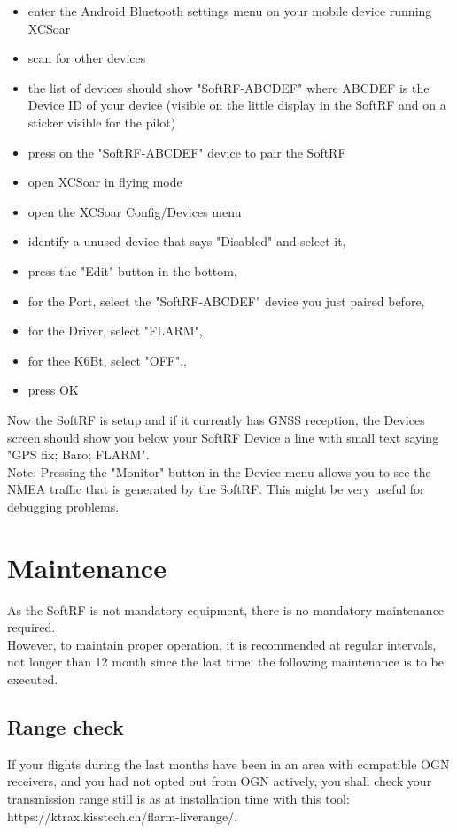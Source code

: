 \documentclass[10pt,a4paper]{article}
\begin{document}
\begin{itemize}
\item enter the Android Bluetooth settings menu on your mobile device running XCSoar
\item scan for other devices
\item the list of devices should show "SoftRF-ABCDEF" where ABCDEF is the Device ID of your device (visible on the little display in the SoftRF and on a sticker visible for the pilot)
\item press on the "SoftRF-ABCDEF" device to pair the SoftRF
\item open XCSoar in flying mode
\item open the XCSoar Config/Devices menu
\item identify a unused device that says "Disabled" and select it, 
\item press the "Edit" button in the bottom,
\item for the Port, select the "SoftRF-ABCDEF" device you just paired before,
\item for the Driver, select "FLARM",
\item for thee K6Bt, select "OFF",,
\item press OK
\end{itemize}

Now the SoftRF is setup and if it currently has GNSS reception, the Devices screen should show you below your SoftRF Device a line with small text saying "GPS fix; Baro; FLARM".\\

Note: Pressing the "Monitor" button in the Device menu allows you to see the NMEA traffic that is generated by the SoftRF. This might be very useful for debugging problems.

\section{Maintenance}
As the SoftRF is not mandatory equipment, there is no mandatory maintenance required.\\

However, to maintain proper operation, it is recommended at regular intervals, not longer than 12 month since the last time, the following maintenance is to be executed.

\subsection{Range check}
If your flights during the last months have been in an area with compatible OGN receivers, and you had not opted out from OGN actively, you shall check your transmission range still is as at installation time with this tool: https://ktrax.kisstech.ch/flarm-liverange/.
\end{document}

